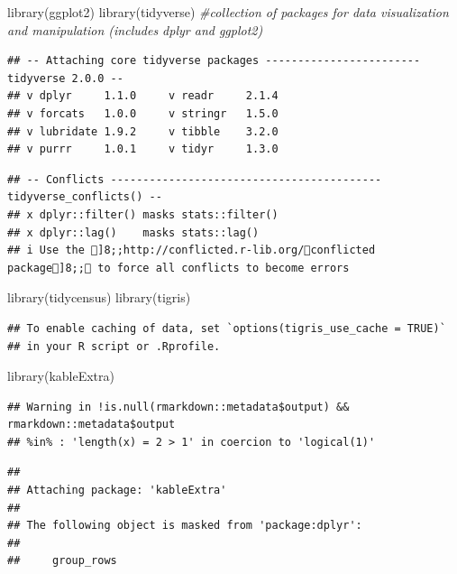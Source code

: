 \documentclass[
]{article}
\newenvironment{Shaded}{\begin{snugshade}}{\end{snugshade}}
\newcommand{\CommentTok}[1]{\textcolor[rgb]{0.56,0.35,0.01}{\textit{#1}}}
\newcommand{\FunctionTok}[1]{\textcolor[rgb]{0.00,0.00,0.00}{#1}}
\newcommand{\NormalTok}[1]{#1}
\begin{document}
\begin{Shaded}
\begin{Highlighting}[]
\FunctionTok{library}\NormalTok{(ggplot2) }
\FunctionTok{library}\NormalTok{(tidyverse) }\CommentTok{\#collection of packages for data visualization and manipulation (includes dplyr and ggplot2)}
\end{Highlighting}
\end{Shaded}

\begin{verbatim}
## -- Attaching core tidyverse packages ------------------------ tidyverse 2.0.0 --
## v dplyr     1.1.0     v readr     2.1.4
## v forcats   1.0.0     v stringr   1.5.0
## v lubridate 1.9.2     v tibble    3.2.0
## v purrr     1.0.1     v tidyr     1.3.0
\end{verbatim}

\begin{verbatim}
## -- Conflicts ------------------------------------------ tidyverse_conflicts() --
## x dplyr::filter() masks stats::filter()
## x dplyr::lag()    masks stats::lag()
## i Use the ]8;;http://conflicted.r-lib.org/conflicted package]8;; to force all conflicts to become errors
\end{verbatim}

\begin{Shaded}
\begin{Highlighting}[]
\FunctionTok{library}\NormalTok{(tidycensus)}
\FunctionTok{library}\NormalTok{(tigris)}
\end{Highlighting}
\end{Shaded}

\begin{verbatim}
## To enable caching of data, set `options(tigris_use_cache = TRUE)`
## in your R script or .Rprofile.
\end{verbatim}

\begin{Shaded}
\begin{Highlighting}[]
\FunctionTok{library}\NormalTok{(kableExtra)}
\end{Highlighting}
\end{Shaded}

\begin{verbatim}
## Warning in !is.null(rmarkdown::metadata$output) && rmarkdown::metadata$output
## %in% : 'length(x) = 2 > 1' in coercion to 'logical(1)'
\end{verbatim}

\begin{verbatim}
## 
## Attaching package: 'kableExtra'
## 
## The following object is masked from 'package:dplyr':
## 
##     group_rows
\end{verbatim}
\end{document}
